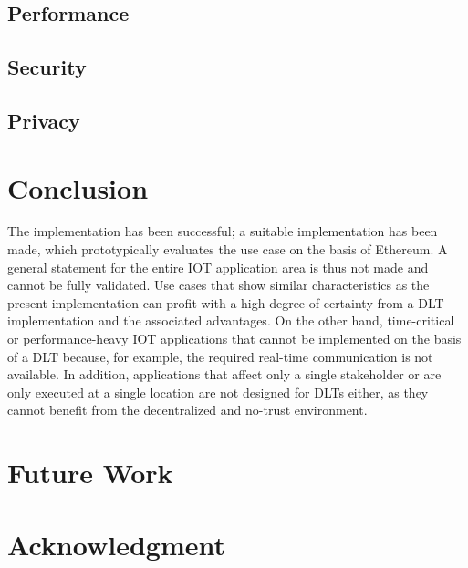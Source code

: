 \documentclass[conference]{IEEEtran}
\begin{document}
\subsection{Performance}

\subsection{Security}

\subsection{Privacy}



\section{Conclusion}
The implementation has been successful; a suitable implementation has been made, which prototypically evaluates the use case on the basis of Ethereum. A general statement for the entire IOT application area is thus not made and cannot be fully validated.  Use cases that show similar characteristics as the present implementation can profit with a high degree of certainty from a DLT implementation and the associated advantages. On the other hand, time-critical or performance-heavy IOT applications that cannot be implemented on the basis of a DLT because, for example, the required real-time communication is not available. In addition, applications that affect only a single stakeholder or are only executed at a single location are not designed for DLTs either, as they cannot benefit from the decentralized and no-trust environment.

\section{Future Work}
\textit{\lipsum[1-1]}

\section*{Acknowledgment}
\textit{\lipsum[1-1]}





\end{document}
